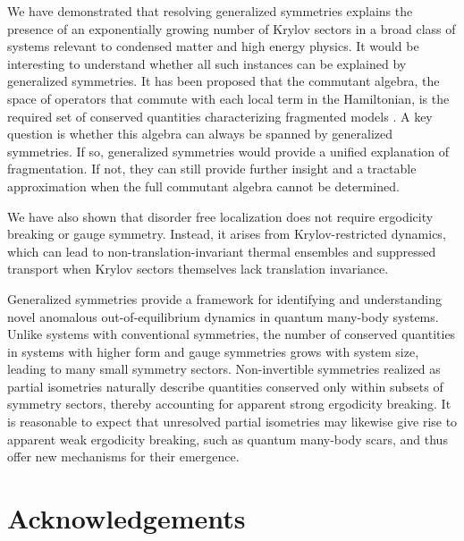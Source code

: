 \documentclass[
 reprint,
 amsmath,amssymb,
 aps,floatfix,prl,superscriptaddress
]{revtex4-2}
\begin{document}
We have demonstrated that resolving generalized symmetries explains the presence of an exponentially growing number of Krylov sectors in a broad class of systems relevant to condensed matter and high energy physics.  It would be interesting to understand whether all such instances can be explained by generalized symmetries. It has been proposed that the commutant algebra, the space of operators that commute with each local term in the Hamiltonian, is the required set of conserved quantities characterizing fragmented models \cite{Moudgalya_2022}. A key question is whether this algebra can always be spanned by generalized symmetries. If so, generalized symmetries would provide a unified explanation of fragmentation. If not, they can still provide further insight and a tractable approximation when the full commutant algebra cannot be determined.

We have also shown that disorder free localization \cite{Smith_2017, Gyawali:2024hrz, Halimeh:2025vvp,Karpov:2020nhy,Halimeh:2021nep,Li:2021lay,Papaefstathiou:2020rvv} does not require ergodicity breaking or gauge symmetry. Instead, it arises from Krylov-restricted dynamics, which can lead to non-translation-invariant thermal ensembles and suppressed transport when Krylov sectors themselves lack translation invariance.


Generalized symmetries provide a framework for identifying and understanding novel anomalous out-of-equilibrium dynamics in quantum many-body systems. Unlike systems with conventional symmetries, the number of conserved quantities in systems with higher form and gauge symmetries grows with system size, leading to many small symmetry sectors.
Non-invertible symmetries realized as partial isometries naturally describe quantities conserved only within subsets of symmetry sectors, thereby accounting for apparent strong ergodicity breaking. It is reasonable to expect that unresolved partial isometries may likewise give rise to apparent weak ergodicity breaking, such as quantum many-body scars, and thus offer new mechanisms for their emergence.



\section{Acknowledgements}
\end{document}

